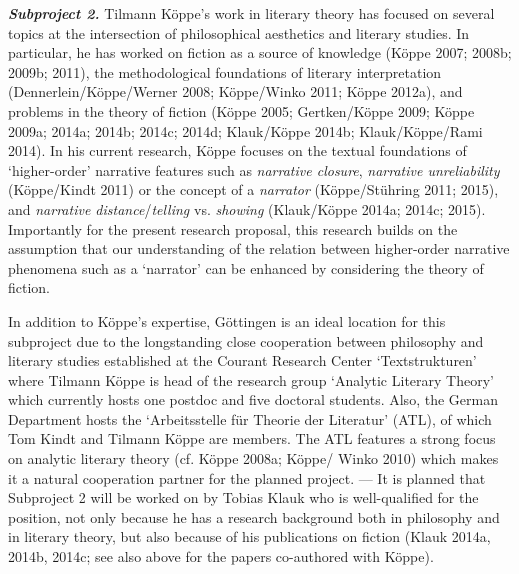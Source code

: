 \vspace{.2cm}
\noindent \textbf{\emph{Subproject 2.}} Tilmann K\"oppe's work in literary theory has focused on several topics at the intersection of philosophical aesthetics and literary studies. In particular, he has worked on fiction as a source of knowledge (K\"oppe 2007; 2008b; 2009b; 2011), the methodological foundations of literary interpretation (Dennerlein/K\"oppe/Werner 2008; K\"oppe/Winko 2011; K\"oppe 2012a), and problems in the theory of fiction (K\"oppe 2005; Gertken/K\"oppe 2009; K\"oppe 2009a; 2014a; 2014b; 2014c; 2014d; Klauk/K\"oppe 2014b; Klauk/K\"oppe/Rami 2014). In his current research, K\"oppe focuses on the textual foundations of `higher-order' narrative features such as \emph{narrative closure}, \emph{narrative unreliability} (K\"oppe/Kindt 2011) or the concept of a \emph{narrator} (K\"oppe/St\"uhring 2011; 2015), and \emph{narrative distance}/\emph{telling} vs. \emph{showing} (Klauk/K\"oppe 2014a; 2014c; 2015). Importantly for the present research proposal, this research builds on the assumption that our understanding of the relation between higher-order narrative phenomena such as a `narrator' can be enhanced by considering the theory of fiction.

In addition to K\"oppe's expertise, G\"ottingen is an ideal location for this subproject due to the longstanding close cooperation between philosophy and literary studies established at the Courant Research Center `Textstrukturen' where Tilmann K\"oppe is head of the research group `Analytic Literary Theory' which currently hosts one postdoc and five doctoral students. Also, the German Department hosts the `Arbeitsstelle f\"ur Theorie der Literatur' (ATL), of which Tom Kindt and Tilmann K\"oppe are members. The ATL features a strong focus on analytic literary theory (cf. K\"oppe 2008a; K\"oppe/ Winko 2010) which makes it a natural cooperation partner for the planned project. --- It is planned that Subproject 2 will be worked on by Tobias Klauk who is well-qualified for the position, not only because he has a research background both in philosophy and in literary theory, but also because of his publications on fiction (Klauk 2014a, 2014b, 2014c; see also above for the papers co-authored with K\"oppe).

